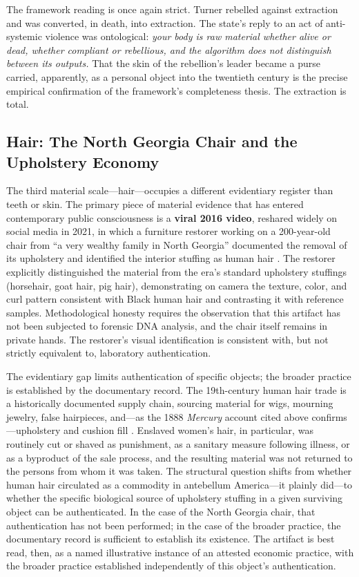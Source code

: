 The framework reading is once again strict. Turner rebelled against extraction and was converted, in death, into extraction. The state's reply to an act of anti-systemic violence was ontological: \textit{your body is raw material whether alive or dead, whether compliant or rebellious, and the algorithm does not distinguish between its outputs.} That the skin of the rebellion's leader became a purse carried, apparently, as a personal object into the twentieth century is the precise empirical confirmation of the framework's completeness thesis. The extraction is total.

\subsection{Hair: The North Georgia Chair and the Upholstery Economy}
\label{subsec:hair}

The third material scale---hair---occupies a different evidentiary register than teeth or skin. The primary piece of material evidence that has entered contemporary public consciousness is a \textbf{viral 2016 video}, reshared widely on social media in 2021, in which a furniture restorer working on a 200-year-old chair from ``a very wealthy family in North Georgia'' documented the removal of its upholstery and identified the interior stuffing as human hair \cite{newsweek_chair}. The restorer explicitly distinguished the material from the era's standard upholstery stuffings (horsehair, goat hair, pig hair), demonstrating on camera the texture, color, and curl pattern consistent with Black human hair and contrasting it with reference samples. Methodological honesty requires the observation that this artifact has not been subjected to forensic DNA analysis, and the chair itself remains in private hands. The restorer's visual identification is consistent with, but not strictly equivalent to, laboratory authentication.

The evidentiary gap limits authentication of specific objects; the broader practice is established by the documentary record. The 19th-century human hair trade is a historically documented supply chain, sourcing material for wigs, mourning jewelry, false hairpieces, and---as the 1888 \textit{Mercury} account cited above confirms---upholstery and cushion fill \cite{jim_crow_museum_leather}. Enslaved women's hair, in particular, was routinely cut or shaved as punishment, as a sanitary measure following illness, or as a byproduct of the sale process, and the resulting material was not returned to the persons from whom it was taken. The structural question shifts from whether human hair circulated as a commodity in antebellum America---it plainly did---to whether the specific biological source of upholstery stuffing in a given surviving object can be authenticated. In the case of the North Georgia chair, that authentication has not been performed; in the case of the broader practice, the documentary record is sufficient to establish its existence. The artifact is best read, then, as a named illustrative instance of an attested economic practice, with the broader practice established independently of this object's authentication.

